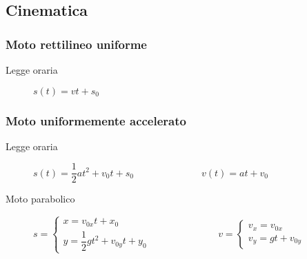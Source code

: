 \documentclass[a4paper,11pt,italian]{article}
\begin{document}
\subsection{Cinematica}\label{sec:cinematica}
\subsubsection{Moto rettilineo uniforme}
\begin{description}
  \item[Legge oraria] 
  $ s(t) = v  t + s_0 $
\end{description}

\subsubsection{Moto uniformemente accelerato}
\begin{description}
  \item[Legge oraria] 
  $ s(t) = \dfrac{1}{2} a t^2 + v_0 t + s_0 $~~~~~~~~~~~~~~$ v(t) = at + v_0 $
  
  \item[Moto parabolico] 
%   
  $ s= 
  \left\{ 
  \begin{array}{l}
  x = v_{0x}t + x_0 \\ 
  y = \dfrac{1}{2}gt^2 + v_{0y}t + y_0
  \end{array}
  \right.
  $~~~~~~~~~~~~~~$ v=
  \left\{ 
  \begin{array}{l}
  v_x = v_{0x} \\ 
  v_y = gt + v_{0y}
  \end{array}
  \right.
  $
%

\end{description}
\end{document}
